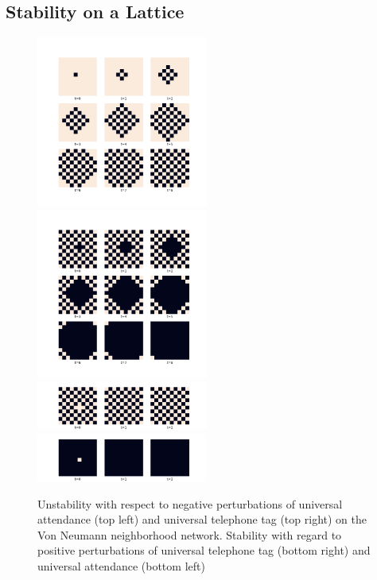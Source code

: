 \documentclass[12pt]{article}
\begin{document}
\subsection{Stability on a Lattice}

\begin{figure}[h!]
\includegraphics[width=0.5\textwidth]{one_minus.png}
\includegraphics[width=0.5\textwidth]{alt_minus.png}
\includegraphics[width=0.5\textwidth]{alt_plus.png}
\includegraphics[width=0.5\textwidth]{zero_plus.png}
\caption{Unstability with respect to negative perturbations of universal attendance (top left) and universal telephone tag (top right) on the Von Neumann neighborhood network.  Stability with regard to positive perturbations of universal telephone tag (bottom right) and universal attendance (bottom left)}
\end{figure}
\end{document}
